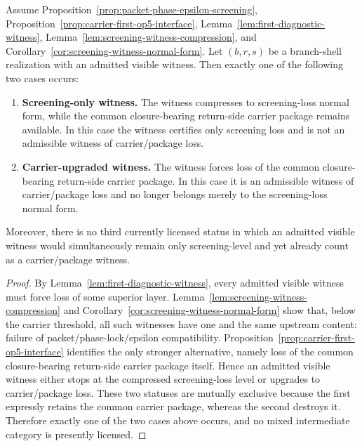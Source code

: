 \begin{lemma}
\label{lem:carrier-witness-separation}
Assume Proposition~\ref{prop:packet-phase-epsilon-screening}, Proposition~\ref{prop:carrier-first-op5-interface}, Lemma~\ref{lem:first-diagnostic-witness}, Lemma~\ref{lem:screening-witness-compression}, and Corollary~\ref{cor:screening-witness-normal-form}. Let $(b,r,s)$ be a branch-shell realization with an admitted visible witness. Then exactly one of the following two cases occurs:
\begin{enumerate}[leftmargin=2em,label=(\roman*)]
\item \textbf{Screening-only witness.} The witness compresses to screening-loss normal form, while the common closure-bearing return-side carrier package remains available. In this case the witness certifies only screening loss and is not an admissible witness of carrier/package loss.
\item \textbf{Carrier-upgraded witness.} The witness forces loss of the common closure-bearing return-side carrier package. In this case it is an admissible witness of carrier/package loss and no longer belongs merely to the screening-loss normal form.
\end{enumerate}
Moreover, there is no third currently licensed status in which an admitted visible witness would simultaneously remain only screening-level and yet already count as a carrier/package witness.
\end{lemma}

\begin{proof}
By Lemma~\ref{lem:first-diagnostic-witness}, every admitted visible witness must force loss of some superior layer. Lemma~\ref{lem:screening-witness-compression} and Corollary~\ref{cor:screening-witness-normal-form} show that, below the carrier threshold, all such witnesses have one and the same upstream content: failure of packet/phase-lock/epsilon compatibility. Proposition~\ref{prop:carrier-first-op5-interface} identifies the only stronger alternative, namely loss of the common closure-bearing return-side carrier package itself. Hence an admitted visible witness either stops at the compressed screening-loss level or upgrades to carrier/package loss. These two statuses are mutually exclusive because the first expressly retains the common carrier package, whereas the second destroys it. Therefore exactly one of the two cases above occurs, and no mixed intermediate category is presently licensed.
\end{proof}

